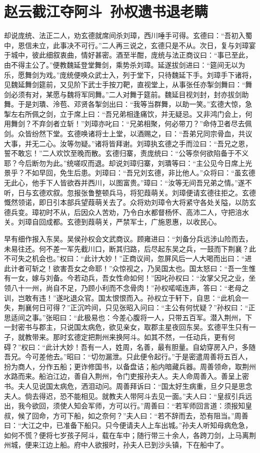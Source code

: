\chapter{赵云截江夺阿斗~孙权遗书退老瞒}

却说庞统、法正二人，劝玄德就席间杀刘璋，西川唾手可得。玄德曰：“吾初入蜀中，恩信未立，此事决不可行。”二人再三说之，玄德只是不从。次日，复与刘璋宴于城中，彼此细叙衷曲，情好甚密。酒至半酣，庞统与法正商议曰：“事已至此，由不得主公了。”便教魏延登堂舞剑，乘势杀刘璋。延遂拔剑进曰：“筵间无以为乐，愿舞剑为戏。”庞统便唤众武士入，列于堂下，只待魏延下手。刘璋手下诸将，见魏延舞剑筵前，又见阶下武士手按刀靶，直视堂上，从事张任亦掣剑舞曰：“舞剑必须有对，某愿与魏将军同舞。”二人对舞于筵前。魏延目视刘封，封亦拔剑助舞。于是刘璝、泠苞、邓贤各掣剑出曰：“我等当群舞，以助一笑。”玄德大惊，急掣左右所佩之剑，立于席上曰：“吾兄弟相逢痛饮，并无疑忌。又非鸿门会上，何用舞剑？不弃剑者立斩！”刘璋亦叱曰：“兄弟相聚，何必带刀？”命侍卫者尽去佩剑。众皆纷然下堂。玄德唤诸将士上堂，以酒赐之，曰：“吾弟兄同宗骨血，共议大事，并无二心。汝等勿疑。”诸将皆拜谢。刘璋执玄德之手而泣曰：“吾兄之恩，誓不敢忘！”二人欢饮至晚而散。玄德归寨，责庞统曰：“公等奈何欲陷备于不义耶？今后断勿为此。”统嗟叹而退。却说刘璋归寨，刘璝等曰：“主公见今日席上光景乎？不如早回，免生后患。刘璋曰：“吾兄刘玄德，非比他人。”众将曰：“虽玄德无此心，他手下人皆欲吞并西川，以图富贵。”璋曰：“汝等无间吾兄弟之情。”遂不听，日与玄德欢叙。忽报张鲁整顿兵马，将犯葭萌关。刘璋便请玄德往拒之。玄德慨然领诺，即日引本部兵望葭萌关去了。众将劝刘璋令大将紧守各处关隘，以防玄德兵变。璋初时不从，后因众人苦劝，乃令白水都督杨怀、高沛二人，守把涪水关。刘璋自回成都。玄德到葭萌关，严禁军士，广施恩惠，以收民心。

早有细作报入东吴。吴侯孙权会文武商议。顾雍进曰：“刘备分兵远涉山险而去，未易往还。何不差一军先截川口，断其归路，后尽起东吴之兵，一鼓而下荆襄？此不可失之机会也。”权曰：“此计大妙！”正商议间，忽屏风后一人大喝而出曰：“进此计者可斩之！欲害吾女之命耶！”众惊视之，乃吴国太也。国太怒曰：“吾一生惟有一女，嫁与刘备。今若动兵，吾女性命如何！”因叱孙权曰：“汝掌父兄之业，坐领八十一州，尚自不足，乃顾小利而不念骨肉！”孙权喏喏连声，答曰：“老母之训，岂敢有违！”遂叱退众官。国太恨恨而入。孙权立于轩下，自思：“此机会一失，荆襄何日可得？”正沉吟间，只见张昭入问曰：“主公有何忧疑？”孙权曰：“正思适间之事。”张昭曰：“此极易也：今差心腹将一人，只带五百军。潜入荆州，下一封密书与郡主，只说国太病危，欲见亲女，取郡主星夜回东吴。玄德平生只有一子，就教带来。那时玄德定把荆州来换阿斗。如其不然，一任动兵，更有何碍？”权曰：“此计大妙！吾有一人，姓周，名善，最有胆量。自幼穿房入户，多随吾兄。今可差他去。”昭曰：“切勿漏泄。只此便令起行。”于是密遣周善将五百人，扮为商人，分作五船；更诈修国书，以备盘诘；船内暗藏兵器。周善领命，取荆州水路而来。船泊江边，善自入荆州，令门吏报孙夫人。夫人命周善入。善呈上密书。夫人见说国太病危，洒泪动问。周善拜诉曰：“国太好生病重，旦夕只是思念夫人。倘去得迟，恐不能相见。就教夫人带阿斗去见一面。”夫人曰：“皇叔引兵远出，我今欲回，须使人知会军师，方可以行。”周善曰：“若军师回言道：须报知皇叔，候了回命，方可下船，如之奈何？”夫人曰：“若不辞而去，恐有阻当。”周善曰：“大江之中，已准备下船只。只今便请夫人上车出城。”孙夫人听知母病危急，如何不慌？便将七岁孩子阿斗，载在车中；随行带三十余人，各跨刀剑，上马离荆州城，便来江边上船。府中人欲报时，孙夫人已到沙头镇，下在船中了。

